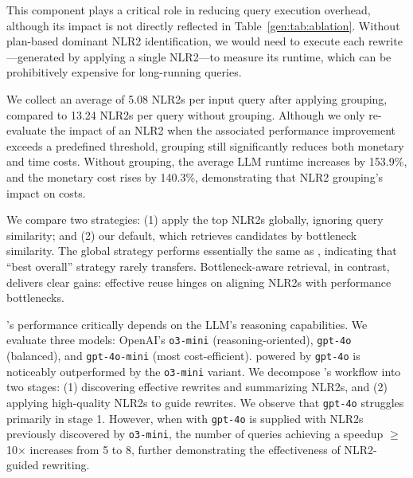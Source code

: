  This component plays a critical role in reducing query execution overhead, although its impact is not directly reflected in Table~\ref{gen:tab:ablation}. Without plan-based dominant NLR2 identification, we would need to execute each rewrite—generated by applying a single NLR2—to measure its runtime, which can be prohibitively expensive for long-running queries. 

We collect an average of 5.08 NLR2s per input query after applying grouping, compared to 13.24 NLR2s per query without grouping. Although we only re-evaluate the impact of an NLR2 when the associated performance improvement exceeds a predefined threshold, grouping still significantly reduces both monetary and time costs. Without grouping, the average LLM runtime increases by 153.9\%, and the monetary cost rises by 140.3\%,  demonstrating that NLR2 grouping's impact on costs.


We compare two strategies: (1) apply the top NLR2s globally, ignoring query similarity; and (2) our default, which retrieves candidates by bottleneck similarity. The global strategy performs essentially the same as \baseline, indicating that ``best overall'' strategy rarely transfers. Bottleneck-aware retrieval, in contrast, delivers clear gains: effective reuse hinges on aligning NLR2s with performance bottlenecks.




\genrewrite's performance critically depends on the LLM's reasoning capabilities. We evaluate three models: OpenAI’s \texttt{o3-mini} (reasoning-oriented), \texttt{gpt-4o} (balanced), and \texttt{gpt-4o-mini} (most cost-efficient). \genrewrite powered by \texttt{gpt-4o} is noticeably outperformed by the \texttt{o3-mini} variant. We decompose \genrewrite’s workflow into two stages: (1) discovering effective rewrites and summarizing NLR2s, and (2) applying high-quality NLR2s to guide rewrites. We observe that \texttt{gpt-4o} struggles primarily in stage 1. However, when \genrewrite with \texttt{gpt-4o} is supplied with NLR2s previously discovered by \texttt{o3-mini}, the number of queries achieving a speedup $\geq$ 10× increases from 5 to 8, further demonstrating the effectiveness of NLR2-guided rewriting.



